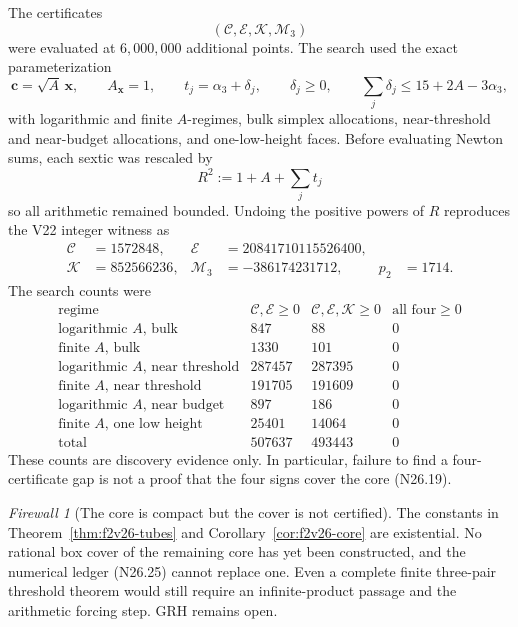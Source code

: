 \documentclass[11pt]{article}
\theoremstyle{definition}
\theoremstyle{remark}
\newtheorem{firewall}[theorem]{Firewall}
\begin{document}
The certificates
\[
 (\mathcal C,\mathcal E,\mathcal K,\mathcal M_3)
 \tag{N26.21}
\]
were evaluated at \(6{,}000{,}000\) additional points.  The search used
the exact parameterization
\[
 \bm c=\sqrt A\,\bm x,\qquad A_{\bm x}=1,\qquad
 t_j=\alpha_3+\delta_j,\qquad
 \delta_j\geq0,\qquad
 \sum_j\delta_j\leq15+2A-3\alpha_3,
 \tag{N26.22}
\]
with logarithmic and finite \(A\)-regimes, bulk simplex allocations,
near-threshold and near-budget allocations, and one-low-height faces.
Before evaluating Newton sums, each sextic was rescaled by
\[
 R^2:=1+A+\sum_jt_j
 \tag{N26.23}
\]
so all arithmetic remained bounded.  Undoing the positive powers of
\(R\) reproduces the V22 integer witness as
\[
\begin{aligned}
 \mathcal C&=1572848,&
 \mathcal E&=20841710115526400,\\
 \mathcal K&=852566236,&
 \mathcal M_3&=-386174231712,&
 p_2&=1714.
\end{aligned}
\tag{N26.24}
\]
The search counts were
\[
\begin{array}{c|r|r|r}
\text{regime}&\mathcal C,\mathcal E\geq0&
 \mathcal C,\mathcal E,\mathcal K\geq0&
 \text{all four}\geq0\\ \hline
\text{logarithmic \(A\), bulk}&847&88&0\\
\text{finite \(A\), bulk}&1330&101&0\\
\text{logarithmic \(A\), near threshold}&287457&287395&0\\
\text{finite \(A\), near threshold}&191705&191609&0\\
\text{logarithmic \(A\), near budget}&897&186&0\\
\text{finite \(A\), one low height}&25401&14064&0\\ \hline
\text{total}&507637&493443&0
\end{array}
\tag{N26.25}
\]
These counts are discovery evidence only.  In particular, failure to find
a four-certificate gap is not a proof that the four signs cover the core
\textup{(N26.19)}.

\begin{firewall}[The core is compact but the cover is not certified]
\label{fire:f2v26}
The constants in Theorem~\ref{thm:f2v26-tubes} and
Corollary~\ref{cor:f2v26-core} are existential.  No rational box cover of
the remaining core has yet been constructed, and the numerical ledger
\textup{(N26.25)} cannot replace one.  Even a complete finite three-pair
threshold theorem would still require an infinite-product passage and
the arithmetic forcing step.  GRH remains open.
\end{firewall}
\end{document}
